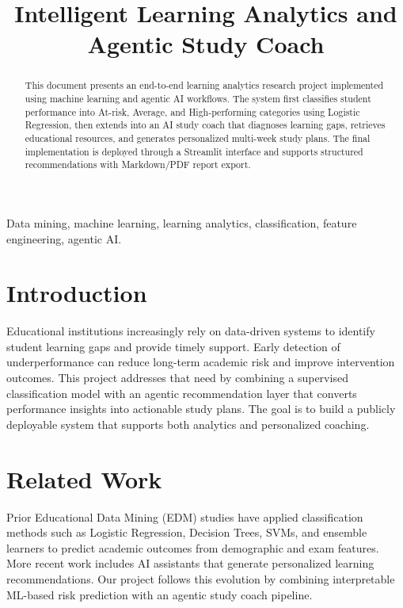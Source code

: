 \documentclass[conference]{IEEEtran}
\begin{document}
\title{Intelligent Learning Analytics and Agentic Study Coach}

\author{
}

\maketitle

\begin{abstract}
This document presents an end-to-end learning analytics research project implemented using machine learning and agentic AI workflows. The system first classifies student performance into At-risk, Average, and High-performing categories using Logistic Regression, then extends into an AI study coach that diagnoses learning gaps, retrieves educational resources, and generates personalized multi-week study plans. The final implementation is deployed through a Streamlit interface and supports structured recommendations with Markdown/PDF report export.
\end{abstract}

\begin{IEEEkeywords}
Data mining, machine learning, learning analytics, classification, feature engineering, agentic AI.
\end{IEEEkeywords}

\section{Introduction}
Educational institutions increasingly rely on data-driven systems to identify student learning gaps and provide timely support. Early detection of underperformance can reduce long-term academic risk and improve intervention outcomes. This project addresses that need by combining a supervised classification model with an agentic recommendation layer that converts performance insights into actionable study plans. The goal is to build a publicly deployable system that supports both analytics and personalized coaching.

\section{Related Work}
Prior Educational Data Mining (EDM) studies have applied classification methods such as Logistic Regression, Decision Trees, SVMs, and ensemble learners to predict academic outcomes from demographic and exam features. More recent work includes AI assistants that generate personalized learning recommendations. Our project follows this evolution by combining interpretable ML-based risk prediction with an agentic study coach pipeline.
\end{document}
